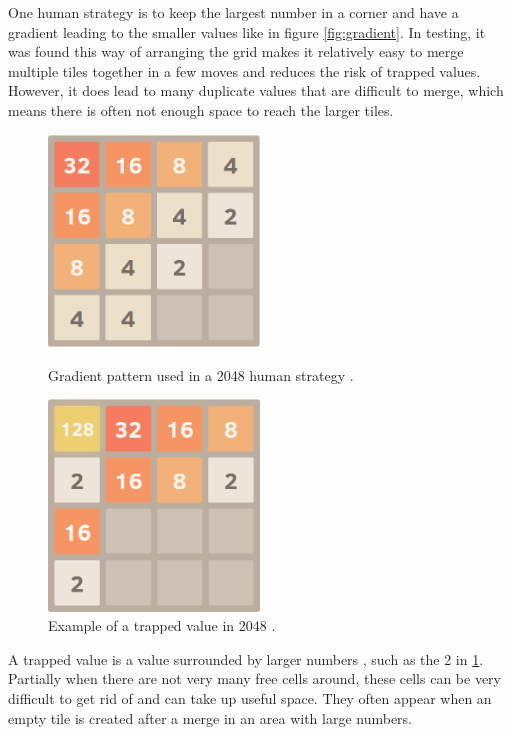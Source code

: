 \documentclass{article}
\begin{document}
One human strategy is to keep the largest number in a corner and have a gradient leading to the smaller values like in figure \ref{fig:gradient}\cite{strategy2048}. In testing, it was found this way of arranging the grid makes it relatively easy to merge multiple tiles together in a few moves and reduces the risk of trapped values. However, it does lead to many duplicate values that are difficult to merge, which means there is often not enough space to reach the larger tiles.
\
\begin{figure}[!tbp]
    \centering
    \begin{minipage}[b]{0.45\textwidth}
        \centering
        \includegraphics[width=0.5\textwidth]{gradient.png}
        \caption{Gradient pattern used in a 2048 human strategy \cite{strategy2048}.}
        \label{fig:gradient}
    \end{minipage}
    \hfill
    \begin{minipage}[b]{0.45\textwidth}
        \centering
        \includegraphics[width=0.5\textwidth]{trapped.png}
        \caption{Example of a trapped value in 2048 \cite{strategy2048}.}
        \label{fig:trap}
    \end{minipage}
\end{figure}
A trapped value is a value surrounded by larger numbers \cite{strategy2048}, such as the 2 in \ref{fig:trap}. Partially when there are not very many free cells around, these cells can be very difficult to get rid of and can take up useful space. They often appear when an empty tile is created after a merge in an area with large numbers. 
\end{document}
